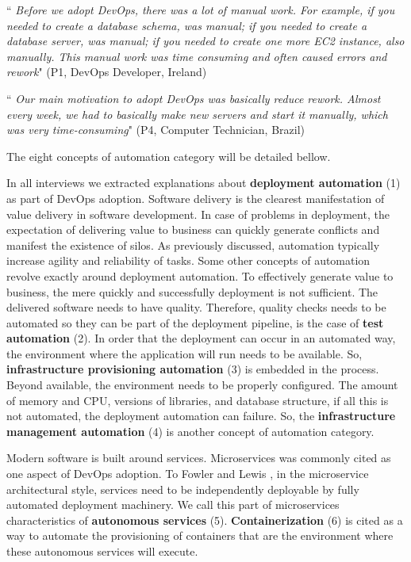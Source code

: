 \begin{mq}
``\emph{
Before we adopt DevOps, there was a lot of manual work. For example, if you
needed to create a database schema, was manual; if you needed to create a
database server, was manual; if you needed to create one more EC2 instance,
also manually. This manual work was time consuming and often caused errors and
rework}" (P1, DevOps Developer, Ireland)
\end{mq}

\begin{mq}
``\emph{
Our main motivation to adopt DevOps was basically reduce rework. Almost every
week, we had to basically make new servers and start it manually, which was
very time-consuming}" (P4, Computer Technician, Brazil)
\end{mq}

The eight concepts of automation category will be detailed bellow.

In all interviews we extracted explanations about \textbf{deployment
automation} (1) as part of DevOps adoption. Software delivery is the clearest
manifestation of value delivery in software development. In case of problems
in deployment, the expectation of delivering value to business can quickly
generate conflicts and manifest the existence of silos. As previously discussed,
automation typically increase agility and reliability of tasks. Some other
concepts of automation revolve exactly around deployment automation. To
effectively generate value to business, the mere quickly and successfully
deployment is not sufficient. The delivered software needs to have quality.
Therefore, quality checks needs to be automated so they can be part of the
deployment pipeline, is the case of \textbf{test automation} (2). In order
that the deployment can occur in an automated way, the environment where the
application will run needs to be available. So, \textbf{infrastructure
provisioning automation} (3) is embedded in the process. Beyond available,
the environment needs to be properly configured. The amount of memory and CPU,
versions of libraries, and database structure, if all this is not automated,
the deployment automation can failure. So, the \textbf{infrastructure management
automation} (4) is another concept of automation category.

Modern software is built around services. Microservices  was commonly cited
as one aspect of DevOps adoption. To Fowler and Lewis
\cite{martinfowler2014microservices}, in the
microservice architectural style, services need to be independently deployable
by fully automated deployment machinery. We call this part of microservices
characteristics of \textbf{autonomous services} (5). \textbf{Containerization}
(6) is cited as a way to automate the provisioning of containers that are the
environment where these autonomous services will execute.

